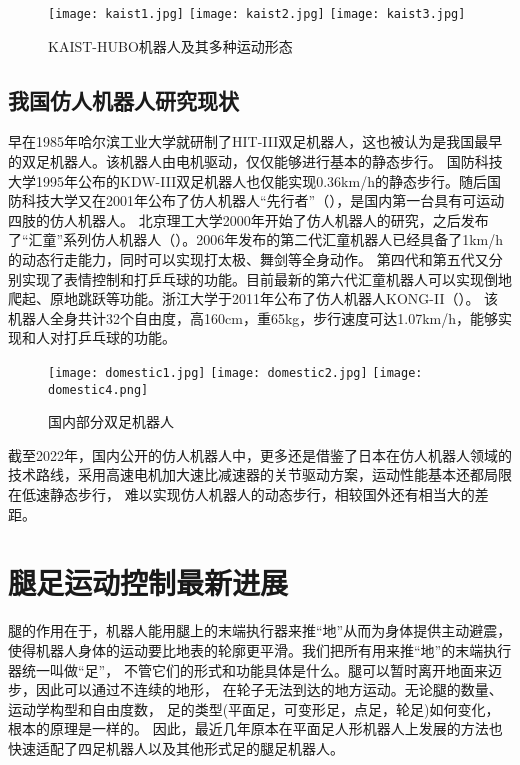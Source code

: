 \begin{figure}[htbp]
    \centering
    \texttt{[image: kaist1.jpg]}
    \texttt{[image: kaist2.jpg]}
    \texttt{[image: kaist3.jpg]}
    \caption{\label{fig:kaist_hubo}KAIST-HUBO机器人及其多种运动形态}
\end{figure}

\subsection{我国仿人机器人研究现状}
早在1985年哈尔滨工业大学就研制了HIT-III双足机器人，这也被认为是我国最早的双足机器人\cite{谢涛2002}。该机器人由电机驱动，仅仅能够进行基本的静态步行。
国防科技大学1995年公布的KDW-III双足机器人也仅能实现0.36km/h的静态步行。随后国防科技大学又在2001年公布了仿人机器人“先行者”（），是国内第一台具有可运动四肢的仿人机器人。
北京理工大学2000年开始了仿人机器人的研究，之后发布了“汇童”系列仿人机器人（）。2006年发布的第二代汇童机器人已经具备了1km/h的动态行走能力，同时可以实现打太极、舞剑等全身动作。
第四代和第五代又分别实现了表情控制和打乒乓球的功能。目前最新的第六代汇童机器人可以实现倒地爬起、原地跳跃等功能\cite{huang2019historical}。浙江大学于2011年公布了仿人机器人KONG-II\cite{sun2011balance}（）。
该机器人全身共计32个自由度，高160cm，重65kg，步行速度可达1.07km/h，能够实现和人对打乒乓球的功能。

\begin{figure}[htbp]
    \centering
        {%
            \texttt{[image: domestic1.jpg]}}
        {%
            \texttt{[image: domestic2.jpg]}}
        {%
            \texttt{[image: domestic4.png]}}              
    \caption{国内部分双足机器人\label{fig:domes_biped}}
\end{figure}

截至2022年，国内公开的仿人机器人中，更多还是借鉴了日本在仿人机器人领域的技术路线，采用高速电机加大速比减速器的关节驱动方案，运动性能基本还都局限在低速静态步行，
难以实现仿人机器人的动态步行，相较国外还有相当大的差距。
\section{腿足运动控制最新进展}
腿的作用在于，机器人能用腿上的末端执行器来推“地”从而为身体提供主动避震，
使得机器人身体的运动要比地表的轮廓更平滑。我们把所有用来推“地”的末端执行器统一叫做“足”，
不管它们的形式和功能具体是什么。腿可以暂时离开地面来迈步，因此可以通过不连续的地形，
在轮子无法到达的地方运动。无论腿的数量、运动学构型和自由度数，
足的类型(平面足，可变形足，点足，轮足)如何变化，根本的原理是一样的。
因此，最近几年原本在平面足人形机器人上发展的方法也快速适配了四足机器人以及其他形式足的腿足机器人。


